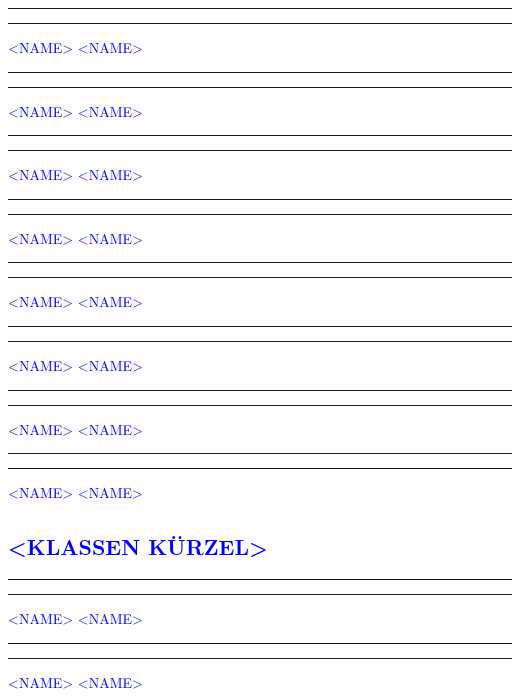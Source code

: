 \documentclass[fontsize=12pt,parskip=half]{scrartcl}
\begin{document}
\vspace{50pt}
\noindent\rule{7cm}{.4pt}\hfill\rule{7cm}{.4pt}\par
\noindent \textcolor{blue}{<NAME>} \hfill\textcolor{blue}{<NAME>}

\vspace{50pt}
\noindent\rule{7cm}{.4pt}\hfill\rule{7cm}{.4pt}\par
\noindent \textcolor{blue}{<NAME>} \hfill\textcolor{blue}{<NAME>}

\vspace{50pt}
\noindent\rule{7cm}{.4pt}\hfill\rule{7cm}{.4pt}\par
\noindent \textcolor{blue}{<NAME>} \hfill\textcolor{blue}{<NAME>}

\vspace{50pt}
\noindent\rule{7cm}{.4pt}\hfill\rule{7cm}{.4pt}\par
\noindent \textcolor{blue}{<NAME>} \hfill\textcolor{blue}{<NAME>}

\vspace{50pt}
\noindent\rule{7cm}{.4pt}\hfill\rule{7cm}{.4pt}\par
\noindent \textcolor{blue}{<NAME>} \hfill\textcolor{blue}{<NAME>}

\vspace{50pt}
\noindent\rule{7cm}{.4pt}\hfill\rule{7cm}{.4pt}\par
\noindent \textcolor{blue}{<NAME>} \hfill\textcolor{blue}{<NAME>}

\vspace{50pt}
\noindent\rule{7cm}{.4pt}\hfill\rule{7cm}{.4pt}\par
\noindent \textcolor{blue}{<NAME>} \hfill\textcolor{blue}{<NAME>}

\vspace{50pt}
\noindent\rule{7cm}{.4pt}\hfill\rule{7cm}{.4pt}\par
\noindent \textcolor{blue}{<NAME>} \hfill\textcolor{blue}{<NAME>}

\pagebreak
\subsection*{\textcolor{blue}{<KLASSEN KÜRZEL>}}
\vspace{50pt}
\noindent\rule{7cm}{.4pt}\hfill\rule{7cm}{.4pt}\par
\noindent \textcolor{blue}{<NAME>} \hfill\textcolor{blue}{<NAME>}

\vspace{50pt}
\noindent\rule{7cm}{.4pt}\hfill\rule{7cm}{.4pt}\par
\noindent \textcolor{blue}{<NAME>} \hfill\textcolor{blue}{<NAME>}
\end{document}
